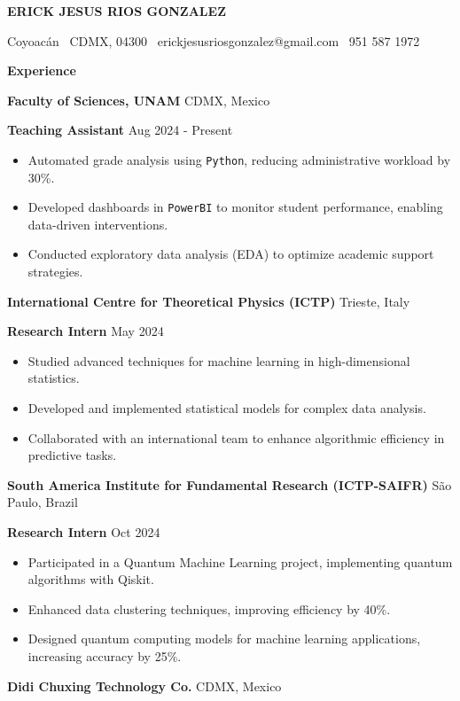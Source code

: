 \documentclass[6pt]{article}
\begin{document}
\begin{center}
    \textbf{ERICK JESUS RIOS GONZALEZ}\\ 
    \hrulefill
\end{center}

\begin{center}
    Coyoac\'an \textbullet \ CDMX, 04300 \textbullet \ erickjesusriosgonzalez@gmail.com \textbullet \  951 587 1972
\end{center}

\vspace{0.5pt}

\begin{center}
    \textbf{Experience}
\end{center}
\textbf{Faculty of Sciences, UNAM} \hfill CDMX, Mexico

\textbf{Teaching Assistant} \hfill Aug 2024 - Present
\begin{itemize}[noitemsep, topsep=0pt, partopsep=0pt, parsep=0pt]
    \item Automated grade analysis using \texttt{Python}, reducing administrative workload by 30\%.
    \item Developed dashboards in \texttt{PowerBI} to monitor student performance, enabling data-driven interventions.
    \item Conducted exploratory data analysis (EDA) to optimize academic support strategies.
\end{itemize}
\vspace{5pt}
\textbf{International Centre for Theoretical Physics (ICTP)} \hfill Trieste, Italy

\textbf{Research Intern} \hfill May 2024
\begin{itemize}[noitemsep, topsep=0pt, partopsep=0pt, parsep=0pt]
    \item Studied advanced techniques for machine learning in high-dimensional statistics.
    \item Developed and implemented statistical models for complex data analysis.
    \item Collaborated with an international team to enhance algorithmic efficiency in predictive tasks.
\end{itemize}
\vspace{5pt}
\textbf{South America Institute for Fundamental Research (ICTP-SAIFR)} \hfill São Paulo, Brazil

\textbf{Research Intern} \hfill Oct 2024
\begin{itemize}[noitemsep, topsep=0pt, partopsep=0pt, parsep=0pt]
    \item Participated in a Quantum Machine Learning project, implementing quantum algorithms with Qiskit.
    \item Enhanced data clustering techniques, improving efficiency by 40\%.
    \item Designed quantum computing models for machine learning applications, increasing accuracy by 25\%.
\end{itemize}
\vspace{5pt}
\textbf{Didi Chuxing Technology Co.} \hfill CDMX, Mexico
\end{document}
